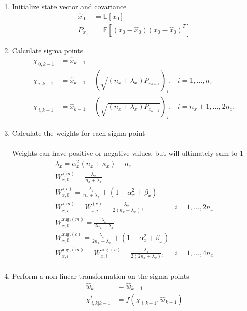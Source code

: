 \begin{enumerate}
    \item Initialize state vector and covariance
    \begin{align}
        \hat{x}_{0} &= \mathbb{E}[x_{0}] \\
        P_{x_{0}} &= \mathbb{E}[(x_{0}-\hat{x}_{0})(x_{0}-\hat{x}_{0})^{T}] 
    \end{align}
    \item Calculate sigma points
    \begin{align}
        \chi_{\ 0,k-1} &= \hat{x}_{k-1} \\
        \chi_{\ i,k-1} &= \hat{x}_{k-1} + (\sqrt{(n_{x}+\lambda_{x})P_{x_{k-1}}})_{i}, &  i=1,\dots,n_{x} \\
        \chi_{\ i,k-1} &= \hat{x}_{k-1} - (\sqrt{(n_{x}+\lambda_{x})P_{x_{k-1}}})_{i},  &  i=n_{x}+1,\dots,2n_{x},
    \end{align}
    \item Calculate the weights for each sigma point \\ \\
    Weights can have positive or negative values, but will ultimately sum to 1 \cite{article6}
    \begin{align}
        \lambda_{x} = \alpha_{x}^{2}(n_{x}+\kappa_{x})-n_{x} \\
        W^{(m)}_{x,0} = \frac{\lambda_{x}}{n_{x}+ \lambda_{x} } \\
        W^{(c)}_{x,0} = \frac{\lambda_{x}}{n_{x}+ \lambda_{x} } + (1 - \alpha^{2}_{x} + \beta_{x}) \\
        W^{(m)}_{x,i} = W^{(c)}_{x,i} = \frac{\lambda_{x}}{2(n_{x}+ \lambda_{x}) }, & i=1,\dots,2n_{x} \\
        W^{\text{aug,}(m)}_{x,0} = \frac{\lambda_{x}}{2n_{x}+ \lambda_{x} } \\
        W^{\text{aug,}(c)}_{x,0} = \frac{\lambda_{x}}{2n_{x}+ \lambda_{x} } + (1 - \alpha^{2}_{x} + \beta_{x}) \\
        W^{\text{aug,}(m)}_{x,i} = W^{\text{aug,}(c)}_{x,i} = \frac{\lambda_{x}}{2(2n_{x}+ \lambda_{x}) }, &  i=1,\dots,4n_{x} \\
    \end{align}
    \item Perform a non-linear transformation on the sigma points
    \begin{align}
        \hat{w}_{k} &= \hat{w}_{k-1} \\
        \chi^{*}_{\ i,k|k-1} &= f(\chi_{\ i,k-1},\hat{w}_{k-1})
    \end{align}

\end{enumerate}
